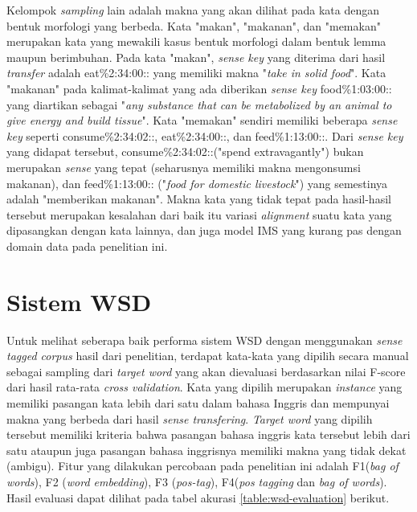 Kelompok \textit{sampling} lain adalah makna yang akan dilihat pada kata dengan bentuk morfologi yang berbeda. Kata "makan", "makanan", dan "memakan" merupakan kata yang mewakili kasus bentuk morfologi dalam bentuk lemma maupun berimbuhan. Pada kata "makan", \textit{sense key} yang diterima dari hasil \textit{transfer} adalah eat\%2:34:00:: yang memiliki makna "\textit{take in solid food}". Kata "makanan" pada kalimat-kalimat yang ada diberikan \textit{sense key} food\%1:03:00:: yang diartikan sebagai "\textit{any substance that can be metabolized by an animal to give energy and build tissue}". Kata "memakan" sendiri memiliki beberapa \textit{sense key} seperti consume\%2:34:02::, eat\%2:34:00::, dan feed\%1:13:00::. Dari \textit{sense key} yang didapat tersebut, consume\%2:34:02::("spend extravagantly") bukan merupakan \textit{sense} yang tepat (seharusnya memiliki makna mengonsumsi makanan), dan feed\%1:13:00:: ("\textit{food for domestic livestock}") yang semestinya adalah "memberikan makanan". Makna kata yang tidak tepat pada hasil-hasil tersebut merupakan kesalahan dari baik itu variasi \textit{alignment} suatu kata yang dipasangkan dengan kata lainnya, dan juga model IMS yang kurang pas dengan domain data pada penelitian ini.

\section{Sistem WSD}

Untuk melihat seberapa baik performa sistem WSD dengan menggunakan \textit{sense tagged corpus} hasil dari penelitian, terdapat kata-kata yang dipilih secara manual sebagai sampling dari \textit{target word} yang akan dievaluasi berdasarkan nilai F-score dari hasil rata-rata \textit{cross validation}. Kata yang dipilih merupakan \textit{instance} yang memiliki pasangan kata lebih dari satu dalam bahasa Inggris dan mempunyai makna yang berbeda dari hasil \textit{sense transfering}. \textit{Target word} yang dipilih tersebut memiliki kriteria bahwa pasangan bahasa inggris kata tersebut lebih dari satu ataupun juga pasangan bahasa inggrisnya memiliki makna yang tidak dekat (ambigu). Fitur yang dilakukan percobaan pada penelitian ini adalah F1(\textit{bag of words}), F2 (\textit{word embedding}), F3 (\textit{pos-tag}), F4(\textit{pos tagging} dan \textit{bag of words}). Hasil evaluasi dapat dilihat pada tabel akurasi  \ref{table:wsd-evaluation} berikut.



